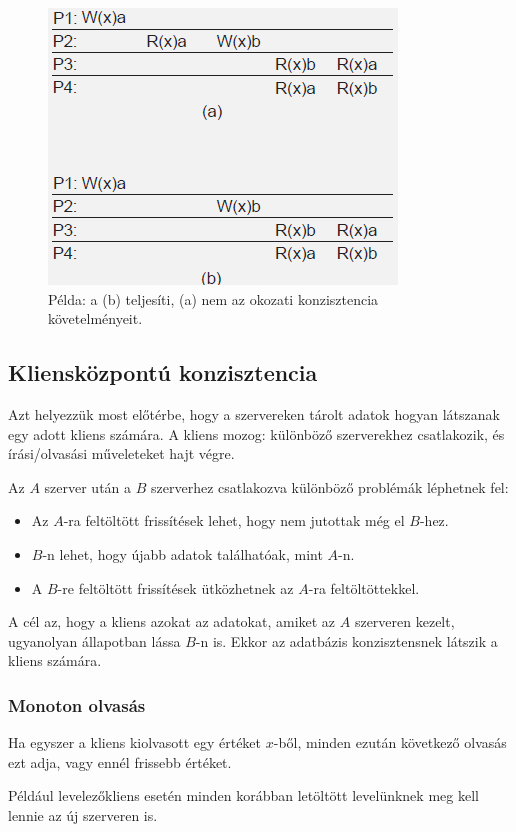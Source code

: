 \documentclass[margin=0px]{article}
\begin{document}
	\begin{figure}[H]
		\centering
		\includegraphics[width=0.4\linewidth]{img/konz_okozati}
		\caption{Példa: a (b) teljesíti, (a) nem az okozati konzisztencia követelményeit.}
		\label{fig:konz_okozati}
	\end{figure}
	
	\subsection{Kliensközpontú konzisztencia}
	
	Azt helyezzük most előtérbe, hogy a szervereken tárolt adatok hogyan látszanak egy adott kliens számára. A kliens
	mozog: különböző szerverekhez csatlakozik, és írási/olvasási műveleteket hajt végre.
	
	Az $A$ szerver után a $B$ szerverhez csatlakozva különböző problémák léphetnek fel:
	
	\begin{itemize}
		\item	Az $A$-ra feltöltött frissítések lehet, hogy nem jutottak még el $B$-hez.
		\item	$B$-n lehet, hogy újabb adatok találhatóak, mint $A$-n.
		\item	A $B$-re feltöltött frissítések ütközhetnek az $A$-ra feltöltöttekkel.
	\end{itemize}
	
	A cél az, hogy a kliens azokat az adatokat, amiket az $A$ szerveren kezelt, ugyanolyan állapotban
	lássa $B$-n is. Ekkor az adatbázis konzisztensnek látszik a kliens számára.\\
	
	\subsubsection{Monoton olvasás}
	Ha egyszer a kliens kiolvasott egy értéket $x$-ből, minden ezután következő
	olvasás ezt adja, vagy ennél frissebb értéket.
	
	Például levelezőkliens esetén minden korábban letöltött levelünknek meg kell lennie az új szerveren is.
	
\end{document}
